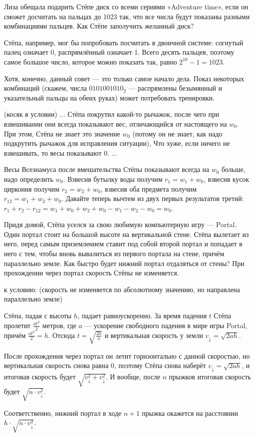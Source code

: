 \begin{itemize}
\itA Лиза обещала подарить Стёпе диск со всеми сериями «Adventure time», если он 
сможет досчитать на пальцах до 1023 так, что все числа будут показаны разными 
комбинациями пальцев. Как Стёпе заполучить желанный диск?

Стёпа, например, мог бы попробовать посчитать в двоичной системе:
согнутый палец означает 0, распрямлённый означает 1. Всего десять пальцев,
поэтому самое большое число, которое можно показать так, равно $2^10-1 = 1023$.

Хотя, конечно, данный совет --- это только самое начало дела. Показ некоторых
комбинаций (скажем, числа $0101001010_2$ --- распрямлены безымянный и указательный
пальцы на обеих руках) может потребовать тренировки.


\itB (косяк в условии) ... Стёпа покрутил какой-то рычажок, после чего при взвешивании
они всегда показывают вес, отличающийся от настоящего на $w_0$. При этом, Стёпа не знает
это значение $w_0$ (потому он не знает, как надо подкрутить рычажок для исправления ситуации), 
Что хуже, если ничего не взвешивать, то весы показывают 0.  ...

Весы Всезнамуса после вмешательства Стёпы показывают всегда на $w_0$ больше, надо определить $w_0$.
Взвесив бутылку воды получим $r_1 = w_1 + w_0$, взвесив кусок циркония получим $r_2 = w_2 + w_0$,
взвесив оба предмета получим $r_{12} = w_1 + w_2 + w_0$. Давайте теперь вычтем из двух 
первых результатов третий:
$r_1 + r_2 - r_{12} = w_1 + w_0 + w_2 + w_0 - w_1 - w_2 - w_0 = w_0$.

\itC Придя домой, Стёпа уселся за свою любимую компьютерную игру — Portal. Один портал стоит на большой 
высоте на вертикальной стене. Стёпа вылетает из него, перед самым приземлением ставит под собой второй 
портал и попадает в него с тем, чтобы вновь вывалиться из первого портала на стене, причём параллельно 
земле. Как быстро будет нижний портал отдаляться от стены? При прохождении через портал скорость Стёпы 
не изменяется.

к условию: (скорость не изменяется по абсолютному значению, но направлена параллельно земле)

Стёпа, падая с высоты $h$, падает равноускоренно. За время падения $t$ Стёпа пролетит 
$\frac{at^2}{2}$ метров, где $a$ --- ускорение свободного падения в мире игры Portal, 
причём $\frac{at^2}{2} = h$. Отсюда $t = \sqrt{\frac{2h}{a}}$ и вертикальная скорость
у земли $v_\downarrow = \sqrt{2ah}$.

После прохождения через портал он летит горизонтально с данной скоростью, но вертикальная
скорость снова равна 0, поэтому Стёпа снова наберёт $v_\downarrow = \sqrt{2ah}$, и
итоговая скорость будет $\sqrt{v_\downarrow^2 + v_\downarrow^2}$.
И вообще, после $n$ прыжков итоговая скорость будет $\sqrt{n \cdot v_\downarrow^2}$.

Соответственно, нижний портал в ходе $n+1$ прыжка окажется на расстоянии $h \cdot \sqrt{n \cdot v_\downarrow^2}$.

\end{itemize}
